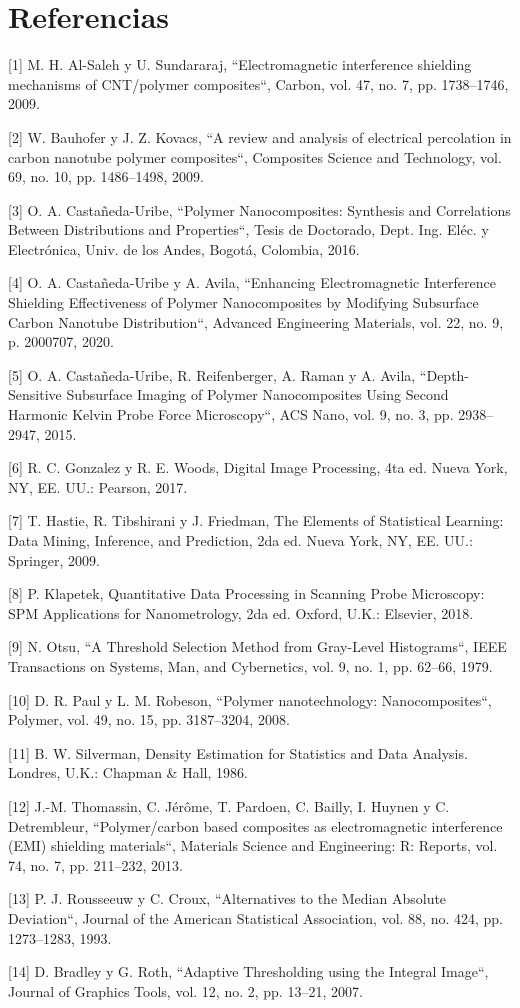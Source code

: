 \chapter*{Referencias}

[1] M. H. Al-Saleh y U. Sundararaj, “Electromagnetic interference shielding mechanisms of CNT/polymer composites“, Carbon, vol. 47, no. 7, pp. 1738–1746, 2009.


[2] W. Bauhofer y J. Z. Kovacs, “A review and analysis of electrical percolation in carbon nanotube polymer composites“, Composites Science and Technology, vol. 69, no. 10, pp. 1486–1498, 2009.


[3] O. A. Castañeda-Uribe, “Polymer Nanocomposites: Synthesis and Correlations Between Distributions and Properties“, Tesis de Doctorado, Dept. Ing. Eléc. y Electrónica, Univ. de los Andes, Bogotá, Colombia, 2016.


[4] O. A. Castañeda-Uribe y A. Avila, “Enhancing Electromagnetic Interference Shielding Effectiveness of Polymer Nanocomposites by Modifying Subsurface Carbon Nanotube Distribution“, Advanced Engineering Materials, vol. 22, no. 9, p. 2000707, 2020.


[5] O. A. Castañeda-Uribe, R. Reifenberger, A. Raman y A. Avila, “Depth-Sensitive Subsurface Imaging of Polymer Nanocomposites Using Second Harmonic Kelvin Probe Force Microscopy“, ACS Nano, vol. 9, no. 3, pp. 2938–2947, 2015.


[6] R. C. Gonzalez y R. E. Woods, Digital Image Processing, 4ta ed. Nueva York, NY, EE. UU.: Pearson, 2017.


[7] T. Hastie, R. Tibshirani y J. Friedman, The Elements of Statistical Learning: Data Mining, Inference, and Prediction, 2da ed. Nueva York, NY, EE. UU.: Springer, 2009.


[8] P. Klapetek, Quantitative Data Processing in Scanning Probe Microscopy: SPM Applications for Nanometrology, 2da ed. Oxford, U.K.: Elsevier, 2018.


[9] N. Otsu, “A Threshold Selection Method from Gray-Level Histograms“, IEEE Transactions on Systems, Man, and Cybernetics, vol. 9, no. 1, pp. 62–66, 1979.


[10] D. R. Paul y L. M. Robeson, “Polymer nanotechnology: Nanocomposites“, Polymer, vol. 49, no. 15, pp. 3187–3204, 2008.


[11] B. W. Silverman, Density Estimation for Statistics and Data Analysis. Londres, U.K.: Chapman \& Hall, 1986.


[12] J.-M. Thomassin, C. Jérôme, T. Pardoen, C. Bailly, I. Huynen y C. Detrembleur, “Polymer/carbon based composites as electromagnetic interference (EMI) shielding materials“, Materials Science and Engineering: R: Reports, vol. 74, no. 7, pp. 211–232, 2013.


[13] P. J. Rousseeuw y C. Croux, “Alternatives to the Median Absolute Deviation“, Journal of the American Statistical Association, vol. 88, no. 424, pp. 1273–1283, 1993.


[14] D. Bradley y G. Roth, “Adaptive Thresholding using the Integral Image“, Journal of Graphics Tools, vol. 12, no. 2, pp. 13–21, 2007.
